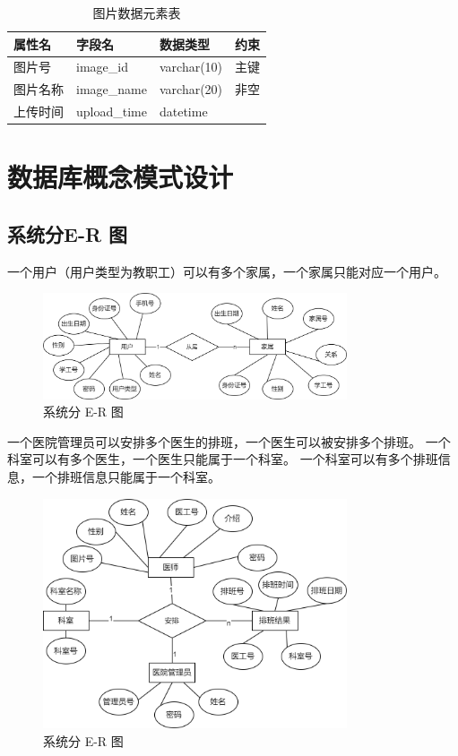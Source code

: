 \documentclass{article}
\begin{document}
\begin{table}[H]
    \centering
    \begin{tabularx}{\textwidth}{|>{\raggedright\arraybackslash}X|>{\raggedright\arraybackslash}X|>{\raggedright\arraybackslash}X|>{\raggedright\arraybackslash}X|}
    \toprule
    \textbf{属性名} & \textbf{字段名} & \textbf{数据类型} & \textbf{约束} \\ \midrule
    图片号 & image\_id & varchar(10) & 主键 \\ \midrule
    图片名称 & image\_name & varchar(20) & 非空 \\ \midrule
    上传时间 & upload\_time & datetime &  \\ \midrule
    \end{tabularx}
    \caption{图片数据元素表}
    \label{tab:image_elements}
\end{table}

\section{数据库概念模式设计}

\subsection{系统分E-R 图}

一个用户（用户类型为教职工）可以有多个家属，一个家属只能对应一个用户。

\begin{figure}[H]
    \centering
    \includegraphics[width=0.8\textwidth]{images/dividedER1.png}
    \caption{系统分 E-R 图}
\end{figure}

一个医院管理员可以安排多个医生的排班，一个医生可以被安排多个排班。
一个科室可以有多个医生，一个医生只能属于一个科室。
一个科室可以有多个排班信息，一个排班信息只能属于一个科室。

\begin{figure}[H]
    \centering
    \includegraphics[width=0.8\textwidth]{images/dividedER2.png}
    \caption{系统分 E-R 图}
\end{figure}
\end{document}
